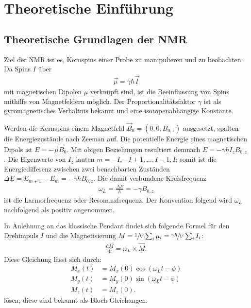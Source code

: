 \chapter{Theoretische Einführung}
\label{chapter:theo}

\section{Theoretische Grundlagen der NMR} \label{section:theo:grundlagen}


Ziel der NMR ist es, Kernspins einer Probe zu manipulieren und zu beobachten.
Da Spins $I$ über
\begin{align}
    \vec{\mu} = \gamma \hbar \vec{I}
\end{align}
mit magnetischen Dipolen $\mu$ verknüpft sind, ist die Beeinflussung von Spins mithilfe von Magnetfeldern möglich. Der Proportionalitätsfaktor $\gamma$ ist als gyromagnetisches Verhältnis bekannt und eine isotopenabhängige Konstante.

Werden die Kernspins einem Magnetfeld $\vec{B}_0 = (0, 0, B_{0,z})$ ausgesetzt, spalten die Energiezustände nach Zeeman auf. Die potentielle Energie eines magnetischen Dipols ist $E = - \vec{\mu} \vec{B}_0$. Mit obigen Beziehungen resultiert demnach $E = - \gamma \hbar I_z B_{0,z}$. Die Eigenwerte von $I_z$ lauten $m = -I, -I + 1, \dots, I - 1, I$; somit ist die Energiedifferenz zwischen zwei benachbarten Zuständen $\Delta E = E_{m+1} - E_{m} = - \gamma \hbar B_{0,z}$. Die damit verbundene Kreisfrequenz
\begin{align}
    \omega_L = \frac{\Delta E}{\hbar} = - \gamma B_{0,z} \label{eqn:lamorfrequenz}
\end{align}
ist die Larmorfrequenz oder Resonanzfrequenz. Der Konvention folgend wird $\omega_L$ nachfolgend als positiv angenommen.



In Anlehnung an das klassische Pendant findet sich folgende Formel für den Drehimpuls $I$ und die Magnetisierung $M = \sfrac{1}{V} \sum_i \mu_i = \sfrac{\gamma \hbar}{V} \sum_i I_i$:
\begin{align}
    \frac{\text{d}\vec{M}}{\text{d}t} = \omega_L \times \vec{M}. \label{eqn:drehmoment}
\end{align}
Diese Gleichung lässt sich durch:
\begin{align}
    M_x (t) &= M_x(0) \cos(\omega_L t - \phi) \\
    M_y (t) &= M_y(0) \sin(\omega_L t - \phi) \\
    M_z (t) &= M_z(0).
\end{align}
lösen; diese sind bekannt als Bloch-Gleichungen.

